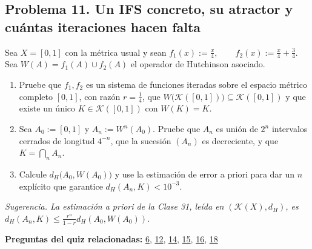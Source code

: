 \documentclass[11pt,a4paper]{article}
\providecommand{\lt}{<}\providecommand{\gt}{>}
\begin{document}
\subsection*{\hypertarget{prob-11}{}Problema 11. Un IFS concreto, su atractor y cuántas iteraciones hacen falta}
Sea $X=[0,1]$ con la métrica usual y sean $f_1(x):=\frac x4,\qquad f_2(x):=\frac x4+\frac34$. Sea $W(A)=f_1(A)\cup f_2(A)$ el operador de Hutchinson asociado.
\begin{enumerate}[label=(\alph*),leftmargin=2.2em,itemsep=2pt]
\item[(a)] Pruebe que $f_1,f_2$ es un sistema de funciones iteradas sobre el espacio métrico completo $[0,1]$, con razón $r=\frac14$, que $W\bigl(\mathcal K([0,1])\bigr)\subseteq\mathcal K([0,1])$ y que existe un único $K\in\mathcal K([0,1])$ con $W(K)=K$.
\item[(b)] Sea $A_0:=[0,1]$ y $A_n:=W^{n}(A_0)$. Pruebe que $A_n$ es unión de $2^{n}$ intervalos cerrados de longitud $4^{-n}$, que la sucesión $(A_n)$ es decreciente, y que $K=\bigcap_{n}A_n$.
\item[(c)] Calcule $d_H\bigl(A_0,W(A_0)\bigr)$ y use la estimación de error a priori para dar un $n$ explícito que garantice $d_H(A_n,K)\lt 10^{-3}$.
\end{enumerate}
{\small\itshape Sugerencia. La estimación a priori de la Clase 31, leída en $(\mathcal K(X),d_H)$, es $d_H(A_n,K)\le\frac{r^{n}}{1-r} d_H(A_0,W(A_0))$.}
\par{\small\textbf{Preguntas del quiz relacionadas:} \hyperlink{r-6}{6}, \hyperlink{r-12}{12}, \hyperlink{r-14}{14}, \hyperlink{r-15}{15}, \hyperlink{r-16}{16}, \hyperlink{r-18}{18}}
\end{document}
